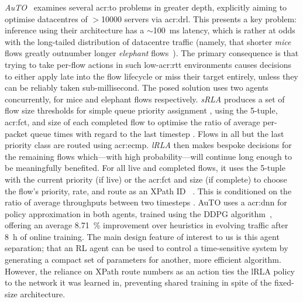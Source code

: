 \emph{AuTO}~\parencite{DBLP:conf/sigcomm/ChenL0L18} examines several \gls{acr:to} problems in greater depth, explicitly aiming to optimise datacentres of $>$\num{10000} servers via \gls{acr:drl}.
This presents a key problem: inference using their architecture has a $\sim$\qty{100}{\milli\second} latency, which is rather at odds with the long-tailed distribution of datacentre traffic (namely, that shorter \emph{mice} flows greatly outnumber longer \emph{elephant} flows~\parencite{DBLP:journals/ccr/PanBPS03}).
The primary consequence is that trying to take per-flow actions in such low-\gls{acr:rtt} environments causes decisions to either apply late into the flow lifecycle or miss their target entirely, unless they can be reliably taken sub-millisecond.
The posed solution uses two agents concurrently, for mice and elephant flows respectively.
\emph{sRLA} produces a set of flow size thresholds for simple queue priority assignment \prllitactreal, using the 5-tuple, \gls{acr:fct}, and size of each completed flow \prllitstate{} to optimise the ratio of average per-packet queue times with regard to the last timestep \prllitreward.
Flows in all but the last priority class are routed using \gls{acr:ecmp}.
\emph{lRLA} then makes bespoke decisions for the remaining flows which---with high probability---will continue long enough to be meaningfully benefited.
For all live and completed flows, it uses the 5-tuple with the current priority (if live) or the \gls{acr:fct} and size (if complete) \prllitstate{} to choose the flow's priority, rate, and route as an XPath ID~\parencite{DBLP:journals/ton/Hu0W0L0ZG16} \parenglance{$\rllitactraw\times\rllitactrealraw\times\rllitactraw$}.
This is conditioned on the ratio of average throughputs between two timesteps \prllitreward.
AuTO uses a \gls{acr:dnn} for policy approximation in both agents, trained using the DDPG algorithm~\parencite{DBLP:journals/corr/LillicrapHPHETS15}, offering an average \qty{8.71}{\percent} improvement over heuristics in evolving traffic after \qty{8}{\hour} of online training.
The main design feature of interest to us is this agent separation; that an RL agent can be used to control a time-sensitive system by generating a compact set of parameters for another, more efficient algorithm.
However, the reliance on XPath route numbers as an action ties the lRLA policy to the network it was learned in, preventing shared training in spite of the fixed-size architecture.

